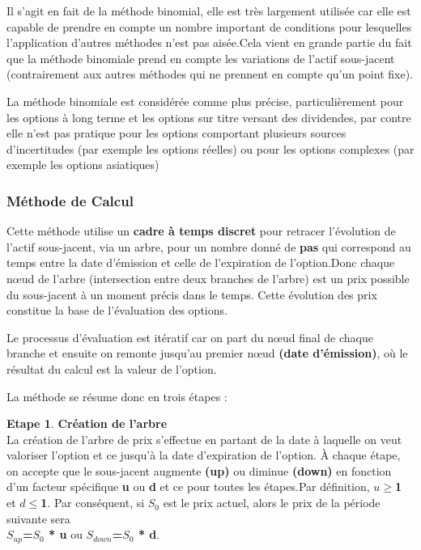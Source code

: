 \documentclass[12pt]{article}
\theoremstyle{definition}
\theoremstyle{definition}
\newtheorem{etape}{Etape}
\begin{document}
Il s'agit en fait de la méthode binomial, elle est très largement utilisée car elle est capable de prendre en compte un nombre important de conditions pour lesquelles l’application d’autres méthodes n’est pas aisée.Cela vient en grande partie du fait que la méthode binomiale prend en compte les variations de l’actif sous-jacent (contrairement aux autres méthodes qui ne prennent en compte qu’un point fixe).

La méthode binomiale est considérée comme plus précise, particulièrement pour les options à long terme et les options sur titre versant des dividendes, par contre elle n'est pas pratique pour les options comportant plusieurs sources d’incertitudes (par exemple les options réelles) ou pour les options complexes (par exemple les options asiatiques)


\subsubsection{Méthode de Calcul}
Cette méthode utilise un \textbf{cadre à temps discret} pour retracer l’évolution de l’actif sous-jacent, via un arbre, pour un nombre donné de \textbf{pas} qui correspond au temps entre la date d’émission et celle de l’expiration de l’option.Donc chaque nœud de l’arbre (intersection entre deux branches de l’arbre) est un prix possible du sous-jacent à un moment précis dans le temps. Cette évolution des prix constitue la base de l’évaluation des options.

Le processus d’évaluation est itératif car on part du nœud final de chaque branche et ensuite on remonte jusqu’au premier nœud \textbf{(date d’émission)}, où le résultat du calcul est la valeur de l’option.

La méthode se résume donc en trois étapes :
\\
\begin{etape}{ \textbf{ Création de l’arbre}}\\
\newline
La création de l’arbre de prix s’effectue en partant de la date à laquelle on veut valoriser l’option et ce jusqu’à la date d’expiration de l’option. À chaque étape, on accepte que le sous-jacent augmente \textbf{(up)} ou diminue \textbf{(down)} en fonction d’un facteur spécifique \textbf{u}  ou \textbf{d} et ce pour toutes les étapes.Par définition, \textbf{$u\geq$1} et \textbf{$d\leq$1}. Par conséquent, si \textbf{$S_{0}$} est le prix actuel, alors le prix de la période suivante sera \\
\textbf{\textbf{$S_{up}$=$S_{0}$ * u}}  ou \textbf{$S_{down}$=$S_{0}$ * d}.\\
\end{etape}
\end{document}
